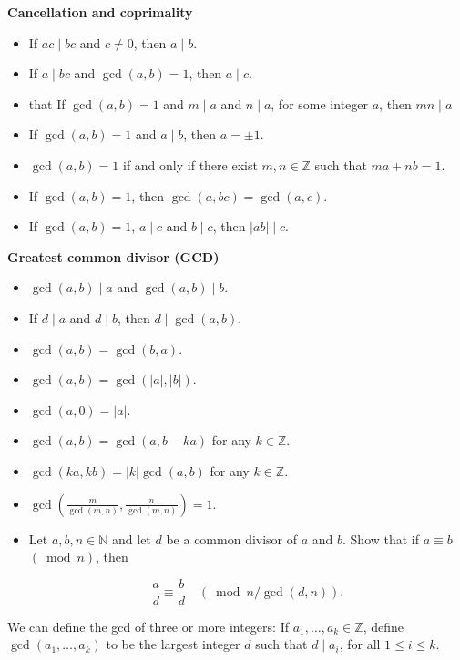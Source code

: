 \begin{mistake}
\textbf{Cancellation and coprimality}
\begin{itemize}
    \item If $ac\mid bc$ and $c\neq0$, then $a\mid b$.
    \item If $a\mid bc$ and $\gcd(a,b)=1$, then $a\mid c$.
    \item that If \(\operatorname{gcd}(a,b) = 1\) and \(m \mid a\) and \(n \mid a\), for some integer \(a\), then \(mn \mid a\)
    \item If $\gcd(a,b)=1$ and $a\mid b$, then $a=\pm1$.
    \item $\gcd(a,b)=1$ if and only if there exist
    $m,n\in\mathbb Z$ such that $ma+nb=1$.
    \item If $\gcd(a,b)=1$, then
    $\gcd(a,bc)=\gcd(a,c)$.
    \item If $\gcd(a,b)=1$, $a\mid c$ and $b\mid c$,
    then $|ab|\mid c$.
\end{itemize}

\textbf{Greatest common divisor (GCD)}
\begin{itemize}
    \item $\gcd(a,b)\mid a$ and $\gcd(a,b)\mid b$.
    \item If $d\mid a$ and $d\mid b$, then $d\mid\gcd(a,b)$.
    \item $\gcd(a,b)=\gcd(b,a)$.
    \item $\gcd(a,b)=\gcd(|a|,|b|)$.
    \item $\gcd(a,0)=|a|$.
    \item $\gcd(a,b)=\gcd(a,b-ka)$ for any $k\in\mathbb Z$.
    \item $\gcd(ka,kb)=|k|\gcd(a,b)$ for any $k\in\mathbb Z$.
    \item \(\operatorname{gcd}\left(\frac{m}{\operatorname{gcd}(m, n)}, \frac{n}{\operatorname{gcd}(m, n)}\right)=1\).
    \item Let \(a, b, n \in \mathbb{N}\) and let \(d\) be a common divisor of \(a\) and \(b\). Show that if \(a \equiv b\) \((\bmod n)\), then

\[
\frac{a}{d} \equiv \frac{b}{d} \quad(\bmod n / \operatorname{gcd}(d, n)) .
\]
\end{itemize}  
\end{mistake}

\begin{mistake}
  We can define the gcd of three or more integers: If \(a_1, \ldots, a_k \in \mathbb{Z}\), define \(\operatorname{gcd}\left(a_1, \ldots, a_k\right)\) to be the largest integer \(d\) such that \(d \mid a_i\), for all \(1 \leq i \leq k\).
\end{mistake}

